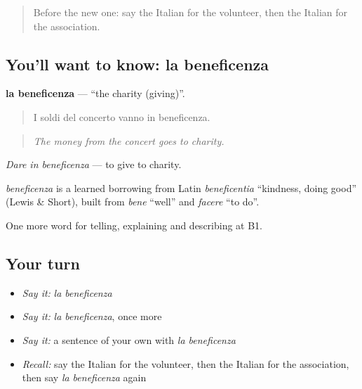 \label{lesson:IT-C367-beneficenza}



\begin{quote}
Before the new one: say the Italian for the volunteer, then the Italian for the association.
\end{quote}

\subsection*{You'll want to know: la beneficenza}
\textbf{la beneficenza} — \textquotedblleft{}the charity (giving)\textquotedblright{}.

\begin{quote}
I soldi del concerto vanno in beneficenza.
\end{quote}

\begin{quote}
\emph{The money from the concert goes to charity.}
\end{quote}

\emph{Dare in beneficenza} — to give to charity.

\begin{cousinweb}
\emph{beneficenza} is a learned borrowing from Latin \emph{beneficentia} \textquotedblleft{}kindness, doing good\textquotedblright{} (Lewis \& Short), built from \emph{bene} \textquotedblleft{}well\textquotedblright{} and \emph{facere} \textquotedblleft{}to do\textquotedblright{}.
\end{cousinweb}

\begin{grammarlens}[title={What you've built}]
One more word for telling, explaining and describing at B1.
\end{grammarlens}

\subsection*{Your turn}
\begin{itemize}
\raggedright
  \item \emph{Say it:} \emph{la beneficenza}
  \item \emph{Say it:} \emph{la beneficenza}, once more
  \item \emph{Say it:} a sentence of your own with \emph{la beneficenza}
  \item \emph{Recall:} say the Italian for the volunteer, then the Italian for the association, then say \emph{la beneficenza} again
\end{itemize}

